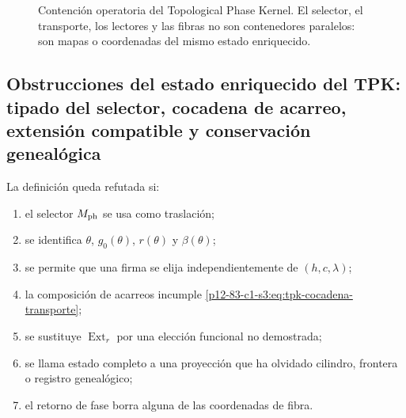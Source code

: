 {\begin{figure}[htbp]
 \centering
 \caption{Contención operatoria del Topological Phase Kernel. El selector,
 el transporte, los lectores y las fibras no son contenedores paralelos: son
 mapas o coordenadas del mismo estado enriquecido.}
 \label{p12-83-c1-s3:fig:tpk-arbol-operatorio-autonomo}
\end{figure}

\subsection{Obstrucciones del estado enriquecido del TPK: tipado del selector, cocadena de acarreo, extensión compatible y conservación genealógica}

\begin{criterion}
La definición queda refutada si:
\begin{enumerate}
 \item el selector \(M_{\rm ph}\) se usa como traslación;
 \item se identifica \(\theta\), \(g_0(\theta)\), \(r(\theta)\) y
       \(\beta(\theta)\);
 \item se permite que una firma se elija independientemente de
       \((h,c,\lambda)\);
 \item la composición de acarreos incumple
       \cref{p12-83-c1-s3:eq:tpk-cocadena-transporte};
 \item se sustituye \(\operatorname{Ext}_r\) por una elección funcional no
       demostrada;
 \item se llama estado completo a una proyección que ha olvidado cilindro,
       frontera o registro genealógico;
 \item el retorno de fase borra alguna de las coordenadas de fibra.
\end{enumerate}
\end{criterion}

}
